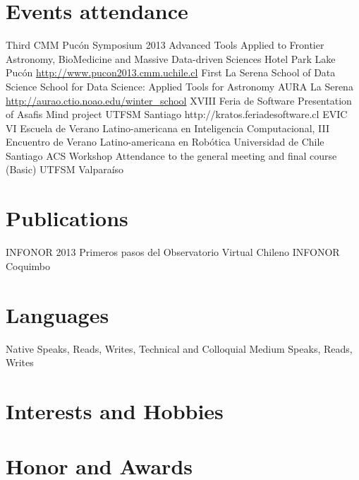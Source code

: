 \documentclass[11pt,a4paper]{moderncv}
\begin{document}
\section{Events attendance}
	{Third CMM Pucón Symposium 2013}
	{Advanced Tools Applied to Frontier Astronomy, BioMedicine and Massive Data-driven Sciences}
	{Hotel Park Lake}
	{Pucón}
	{\url{http://www.pucon2013.cmm.uchile.cl}}
	{First La Serena School of Data Science}
	{School for Data Science: Applied Tools for Astronomy}
	{AURA}
	{La Serena}
	{\url{http://aurao.ctio.noao.edu/winter_school}}
	{XVIII Feria de Software}
	{Presentation of Asafis Mind project}
	{UTFSM}
	{Santiago}
	{http://kratos.feriadesoftware.cl}
	{EVIC}
	{VI Escuela de Verano Latino-americana en Inteligencia Computacional, III Encuentro de Verano Latino-americana en Robótica}
	{Universidad de Chile}
	{Santiago}
	{}
	{ACS Workshop}
	{Attendance to the general meeting and final course (Basic)}
	{UTFSM}
	{Valparaíso}
	{}

\section{Publications}
	{INFONOR 2013}
	{Primeros pasos del Observatorio Virtual Chileno}
	{INFONOR}
	{Coquimbo}
	{}

\section{Languages}
	{Native}
	{Speaks, Reads, Writes, Technical and Colloquial}
	{Medium}
	{Speaks, Reads, Writes}

\newpage
\section{Interests and Hobbies}

\section{Honor and Awards}
\end{document}
